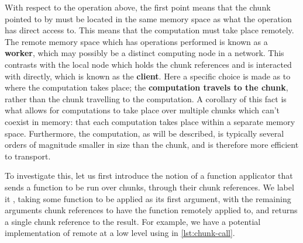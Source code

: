 With respect to the  operation above, the first point means that the chunk pointed to by  must be located in the same memory space as what the  operation has direct access to.
This means that the computation must take place remotely.
The remote memory space which has operations performed is known as a \textbf{worker}, which may possibly be a distinct computing node in a network.
This contrasts with the local node which holds the chunk references and is interacted with directly, which is known as the \textbf{client}.
Here a specific choice is made as to where the computation takes place; the \textbf{computation travels to the chunk}, rather than the chunk travelling to the computation.
A corollary of this fact is what allows for computations to take place over multiple chunks which can't coexist in memory: that each computation takes place within a separate memory space.
Furthermore, the computation, as will be described, is typically several orders of magnitude smaller in size than the chunk, and is therefore more efficient to transport.

To investigate this, let us first introduce the notion of a function applicator that sends a function to be run over chunks, through their chunk references.
We label it , taking some function to be applied as its first argument, with the remaining arguments chunk references to have the function remotely applied to, and returns a single chunk reference to the result.
For example, we have a potential implementation of remote  at a low level using  in \cref{lst:chunk-call}.


